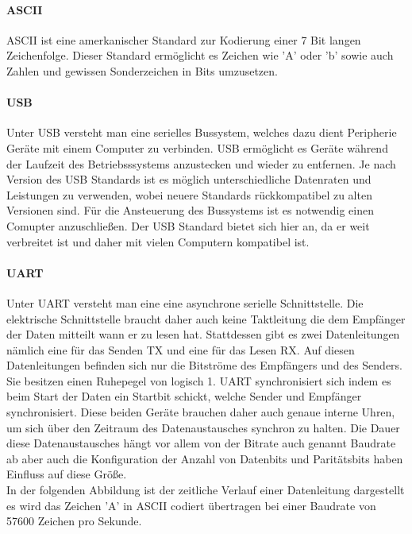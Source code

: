 \paragraph{ASCII}\mbox{}

ASCII ist eine amerkanischer Standard zur Kodierung einer 7 Bit langen Zeichenfolge. Dieser Standard ermöglicht es Zeichen wie 'A' oder 'b' sowie auch Zahlen und gewissen Sonderzeichen in Bits umzusetzen. 
\paragraph{USB}\mbox{}

Unter USB versteht man eine serielles Bussystem, welches dazu dient Peripherie Geräte mit einem Computer zu verbinden. USB ermöglicht es Geräte während der Laufzeit des Betriebsssystems anzustecken und wieder zu entfernen.
Je nach Version des USB Standards ist es möglich unterschiedliche Datenraten und Leistungen zu verwenden, wobei neuere Standards rückkompatibel zu alten Versionen sind. Für die Ansteuerung des Bussystems ist es notwendig einen Comupter anzuschließen. 
Der USB Standard bietet sich hier an, da er weit verbreitet ist und daher mit vielen Computern kompatibel ist.


\paragraph{UART}\mbox{}


Unter UART versteht man eine eine asynchrone serielle Schnittstelle. Die elektrische Schnittstelle braucht daher auch keine Taktleitung die dem Empfänger der Daten mitteilt wann er zu lesen hat. Stattdessen gibt es zwei Datenleitungen nämlich eine 
für das Senden TX und eine für das Lesen RX. Auf diesen Datenleitungen befinden sich nur die Bitströme des Empfängers und des Senders. Sie besitzen einen Ruhepegel von logisch 1.
UART synchronisiert sich indem es beim Start der Daten ein Startbit schickt, welche Sender und Empfänger synchronisiert. 
Diese beiden Geräte brauchen daher auch genaue interne Uhren, um sich über den Zeitraum des Datenaustausches synchron zu halten.
Die Dauer diese Datenaustausches hängt vor allem von der Bitrate auch genannt Baudrate ab aber auch die Konfiguration der Anzahl von Datenbits und Paritätsbits haben Einfluss auf diese Größe. 
\\
In der folgenden Abbildung ist der zeitliche Verlauf einer Datenleitung dargestellt es wird das Zeichen 'A' in ASCII codiert übertragen bei einer Baudrate von 57600 Zeichen pro Sekunde.


